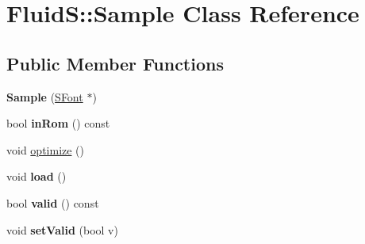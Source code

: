 \hypertarget{class_fluid_s_1_1_sample}{}\section{FluidS\+:\+:Sample Class Reference}
\label{class_fluid_s_1_1_sample}
\subsection*{Public Member Functions}
\begin{DoxyCompactItemize}
\item 
\mbox{\label{class_fluid_s_1_1_sample_acea7692e7f2749989ac50d08baf1178d}} 
{\bfseries Sample} (\hyperlink{class_fluid_s_1_1_s_font}{S\+Font} $\ast$)
\item 
\mbox{\label{class_fluid_s_1_1_sample_ab251310ba0093c4304510d072214a018}} 
bool {\bfseries in\+Rom} () const
\item 
void \hyperlink{class_fluid_s_1_1_sample_ab8ad9753f3b65002d59291872e5bd774}{optimize} ()
\item 
\mbox{\label{class_fluid_s_1_1_sample_a015f1cac51b54ecc0e6ca0e92b015959}} 
void {\bfseries load} ()
\item 
\mbox{\label{class_fluid_s_1_1_sample_a8736303c96343a4c4b5bcec6058796ff}} 
bool {\bfseries valid} () const
\item 
\mbox{\label{class_fluid_s_1_1_sample_a193fd67c80924174870d1f11d4431d12}} 
void {\bfseries set\+Valid} (bool v)
\end{DoxyCompactItemize}
